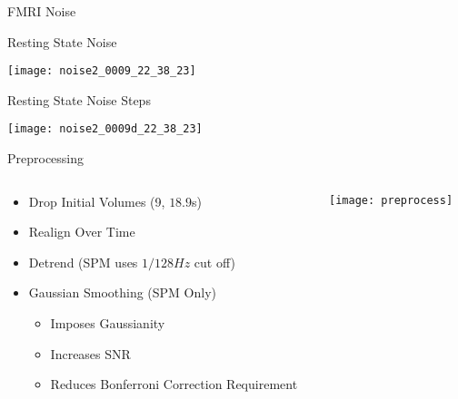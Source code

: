 \begin{frame}{FMRI Noise}
\centering

Resting State Noise

\texttt{[image: noise2\_0009\_22\_38\_23]}

Resting State Noise Steps

\texttt{[image: noise2\_0009d\_22\_38\_23]}

\end{frame}

\begin{frame}{Preprocessing}
  \begin{columns}
    \begin{column}{.6\textwidth}
        \begin{itemize}
            \item Drop Initial Volumes (9, $18.9$s)
            \item Realign Over Time
            \item Detrend (SPM uses $1/128 Hz$ cut off)
            \item Gaussian Smoothing (SPM Only)
            \begin{itemize}
                \item Imposes Gaussianity
                \item Increases SNR
                \item Reduces Bonferroni Correction Requirement
            \end{itemize}
        \end{itemize}
    \end{column}
    
    \begin{column}{.4\textwidth}
        \texttt{[image: preprocess]}
    \end{column}
  \end{columns}
\end{frame}

